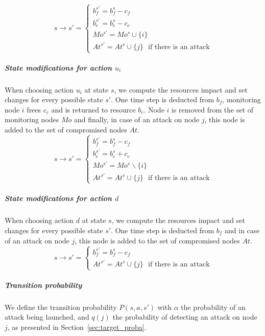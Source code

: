 \begin{equation}
  s \longrightarrow s' =\begin{cases}
    b_f^{s'} = b_f^s - c_f\\
    b_c^{s'} = b_c^s - c_c\\
    Mo^{s'} = Mo^s \cup \{i\}\\
    At^{s'} = At^s \cup \{j\} \text{~~if there is an attack}
  \end{cases}
\end{equation}

\subparagraph*{\textbf{State modifications for action $u_i$}}
When choosing action $u_i$ at state $s$, we compute the resources impact and set changes for every possible state $s'$. One time step is deducted from $b_f$, monitoring node $i$ frees $c_c$ and is returned to resource $b_c$. Node $i$ is removed from the set of monitoring nodes $Mo$ and finally, in case of an attack on node $j$, this node is added to the set of compromised nodes $At$.
\newpage
\begin{equation}
  s \longrightarrow s' =\begin{cases}
    b_f^{s'} = b_f^s - c_f\\
    b_c^{s'} = b_c^s + c_c\\
    Mo^{s'} = Mo^s \backslash\{i\}\\
    At^{s'} = At^s \cup \{j\}\text{~~if there is an attack}
  \end{cases}
\end{equation}

\subparagraph*{\textbf{State modifications for action $d$}}
When choosing action $d$ at state $s$, we compute the resources impact and set changes for every possible state $s'$. One time step is deducted from $b_f$ and in case of an attack on node $j$, this node is added to the set of compromised nodes $At$.
\begin{equation}
  s \longrightarrow s' =\begin{cases}
    b_f^{s'} = b_f^s - c_f\\
    At^{s'} = At^s \cup \{j\}\text{~~if there is an attack}
  \end{cases}
\end{equation}


\subparagraph*{\textbf{Transition probability}}
We define the transition probability $P(s,a,s')$ with $\alpha$ the probability of an attack being launched, and $q(j)$ the probability of detecting an attack on node $j$, as presented in Section~\ref{sec:target_proba}.

